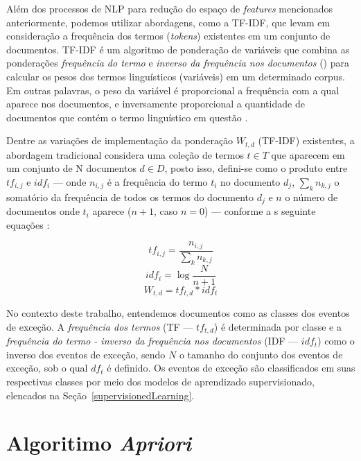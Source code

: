 \documentclass[
	12pt,				%
	oneside,			%
	a4paper,			%
	english,			%
	brazil				%
	]{abntex2ppgsi}
\begin{document}
{{{Além dos processos de NLP para redução do espaço de \textit{features} mencionados anteriormente, podemos utilizar abordagens, como a TF-IDF, que levam em consideração a frequência dos termos (\textit{tokens}) existentes em um conjunto de documentos. TF-IDF é um algoritmo de ponderação de variáveis que combina as ponderações \emph{frequência do termo}  e \emph{inverso da frequência nos documentos} () para calcular os pesos dos termos linguísticos (variáveis) em um determinado corpus. Em outras palavras, o peso da variável é proporcional a frequência com a qual aparece nos documentos, e inversamente proporcional a quantidade de documentos que contém o termo linguístico em questão \cite{wu2018improved, yahav2018comments}. 

Dentre as variações de implementação da ponderação $W_{t,d}$ (TF-IDF) existentes, a abordagem tradicional considera uma coleção de termos $t \in T$ que aparecem em um conjunto de N documentos $d \in D$, posto isso, defini-se como o produto entre $tf_{i,j}$ e $idf_i$ --- onde $n_{i,j}$ é a frequência do termo $t_i$ no documento $d_j$, $\sum_k n_{k,j}$ o somatório da frequência de todos os termos do documento $d_j$ e $n$ o número de documentos onde $t_i$ aparece ($n + 1$, caso $n = 0$) --- conforme a s seguinte equações \cite{wu2018improved}:

\begin{equation}
tf_{i,j} = \frac{n_{i,j}}{\sum_k n_{k,j}}
\end{equation}
\begin{equation}
idf_i = \log \frac{N}{n + 1}
\end{equation}
\begin{equation}
W_{t,d} = tf_{t,d} * idf_t
\end{equation}

No contexto deste trabalho, entendemos documentos como as classes dos eventos de exceção. A \emph{frequência dos termos} (TF --- $tf_{t,d}$) é determinada por classe e a \emph{frequência do termo - inverso da frequência nos documentos} (IDF --- $idf_t $) como o inverso dos eventos de exceção, sendo $N$ o tamanho do conjunto dos eventos de exceção, sob o qual $df_t$ é definido. Os eventos de exceção são classificados em suas respectivas classes por meio dos modelos de aprendizado supervisionado, elencados na Seção~\ref{supervisionedLearning}. 

\section{ Algoritimo \textit{Apriori}}
\label{apriori}

}}}
\end{document}
